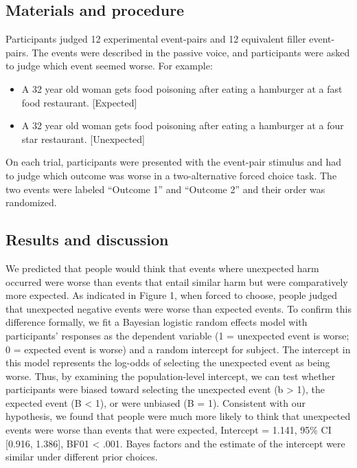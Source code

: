 \documentclass[10pt, letterpaper]{article}
\begin{document}
\subsection{Materials and procedure}\label{materials-and-procedure}

Participants judged 12 experimental event-pairs and 12 equivalent filler
event-pairs. The events were described in the passive voice, and
participants were asked to judge which event seemed worse. For example:

\begin{itemize}
\item
  A 32 year old woman gets food poisoning after eating a hamburger at a
  fast food restaurant. {[}Expected{]}
\item
  A 32 year old woman gets food poisoning after eating a hamburger at a
  four star restaurant. {[}Unexpected{]}
\end{itemize}

On each trial, participants were presented with the event-pair stimulus
and had to judge which outcome was worse in a two-alternative forced
choice task. The two events were labeled ``Outcome 1'' and ``Outcome 2''
and their order was randomized.

\subsection{Results and discussion}\label{results-and-discussion}

We predicted that people would think that events where unexpected harm
occurred were worse than events that entail similar harm but were
comparatively more expected. As indicated in Figure 1, when forced to
choose, people judged that unexpected negative events were worse than
expected events. To confirm this difference formally, we fit a Bayesian
logistic random effects model with participants' responses as the
dependent variable (1 = unexpected event is worse; 0 = expected event is
worse) and a random intercept for subject. The intercept in this model
represents the log-odds of selecting the unexpected event as being
worse. Thus, by examining the population-level intercept, we can test
whether participants were biased toward selecting the unexpected event
(b \textgreater{} 1), the expected event (B \textless{} 1), or were
unbiased (B = 1). Consistent with our hypothesis, we found that people
were much more likely to think that unexpected events were worse than
events that were expected, Intercept = 1.141, 95\% CI {[}0.916,
1.386{]}, BF01 \textless{} .001. Bayes factors and the estimate of the
intercept were similar under different prior choices.
\end{document}
